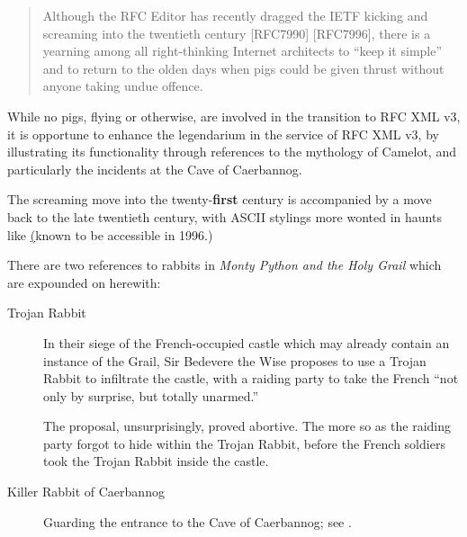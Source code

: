 \documentclass{metanorma}
\begin{document}


\begin{quote}
  Although the RFC Editor has recently dragged the IETF kicking and
  screaming into the twentieth century [RFC7990] [RFC7996], there is a
  yearning among all right-thinking Internet architects to ``keep it
  simple'' and to return to the olden days when pigs could be given
  thrust without anyone taking undue offence.
\end{quote}


While no pigs, flying or otherwise, are involved in the transition
to RFC XML v3, it is opportune to enhance the 
legendarium in the service of RFC XML v3, by illustrating its
functionality through references to the mythology of Camelot, and
particularly the incidents at the Cave of Caerbannog.


The screaming move into the twenty-\textbf{first} century is accompanied by
a move back to the late twentieth century, with ASCII stylings more
wonted in haunts like \href{ftp://ftp.wwa.com/pub/Scarecrow} (known to be
accessible in 1996.)


There are two references to rabbits in
\textit{Monty Python and the Holy Grail} which are expounded on
herewith:


\begin{description}
  \item[Trojan Rabbit]
    In their siege of the French-occupied castle which may already
    contain an instance of the Grail, Sir Bedevere the Wise proposes to
    use a Trojan Rabbit to infiltrate the castle, with a raiding party
    to take the French ``not only by surprise, but totally unarmed.''

    The proposal, unsurprisingly, proved abortive. The more so as the
    raiding party forgot to hide within the Trojan Rabbit, before the
    French soldiers took the Trojan Rabbit inside the castle.

  \item[Killer Rabbit of Caerbannog]
    Guarding the entrance to the Cave of Caerbannog; see .

\end{description}
\end{document}
